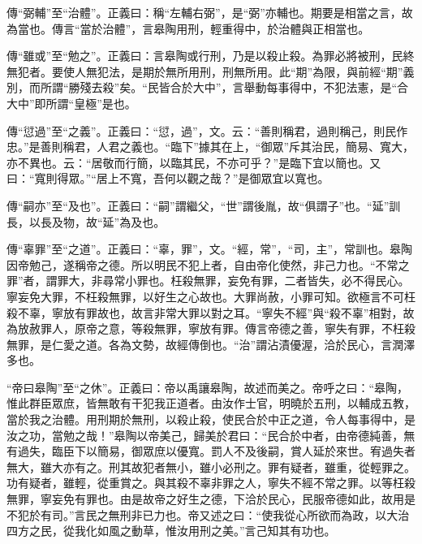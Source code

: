 {\noindent\zhuan{}\fzbyks 傳“弼輔”至“治體”。正義曰：稱“左輔右弼”，是“弼”亦輔也。期要是相當之言，故為當也。傳言“當於治體”，言皋陶用刑，輕重得中，於治體與正相當也。 \par}

{\noindent\zhuan{}\fzbyks 傳“雖或”至“勉之”。正義曰：言皋陶或行刑，乃是以殺止殺。為罪必將被刑，民終無犯者。要使人無犯法，是期於無所用刑，刑無所用。此“期”為限，與前經“期”義別，而所謂“勝殘去殺”矣。“民皆合於大中”，言舉動每事得中，不犯法憲，是“合大中”即所謂“皇極”是也。 \par}

{\noindent\zhuan{}\fzbyks 傳“愆過”至“之義”。正義曰：“愆，過”，文。云：“善則稱君，過則稱己，則民作忠。”是善則稱君，人君之義也。“臨下”據其在上，“御眾”斥其治民，簡易、寬大，亦不異也。云：“居敬而行簡，以臨其民，不亦可乎？”是臨下宜以簡也。又曰：“寬則得眾。”“居上不寬，吾何以觀之哉？”是御眾宜以寬也。 \par}

{\noindent\zhuan{}\fzbyks 傳“嗣亦”至“及也”。正義曰：“嗣”謂繼父，“世”謂後胤，故“俱謂子”也。“延”訓長，以長及物，故“延”為及也。 \par}

{\noindent\zhuan{}\fzbyks 傳“辜罪”至“之道”。正義曰：“辜，罪”，文。“經，常”，“司，主”，常訓也。皋陶因帝勉己，遂稱帝之德。所以明民不犯上者，自由帝化使然，非己力也。“不常之罪”者，謂罪大，非尋常小罪也。枉殺無罪，妄免有罪，二者皆失，必不得民心。寧妄免大罪，不枉殺無罪，以好生之心故也。大罪尚赦，小罪可知。欲極言不可枉殺不辜，寧放有罪故也，故言非常大罪以對之耳。“寧失不經”與“殺不辜”相對，故為放赦罪人，原帝之意，等殺無罪，寧放有罪。傳言帝德之善，寧失有罪，不枉殺無罪，是仁愛之道。各為文勢，故經傳倒也。“治”謂沾漬優渥，洽於民心，言潤澤多也。 \par}

{\noindent\shu{}\fzkt “帝曰皋陶”至“之休”。正義曰：帝以禹讓皋陶，故述而美之。帝呼之曰：“皋陶，惟此群臣眾庶，皆無敢有干犯我正道者。由汝作士官，明曉於五刑，以輔成五教，當於我之治體。用刑期於無刑，以殺止殺，使民合於中正之道，令人每事得中，是汝之功，當勉之哉！”皋陶以帝美己，歸美於君曰：“民合於中者，由帝德純善，無有過失，臨臣下以簡易，御眾庶以優寬。罰人不及後嗣，賞人延於來世。宥過失者無大，雖大亦有之。刑其故犯者無小，雖小必刑之。罪有疑者，雖重，從輕罪之。功有疑者，雖輕，從重賞之。與其殺不辜非罪之人，寧失不經不常之罪。以等枉殺無罪，寧妄免有罪也。由是故帝之好生之德，下洽於民心，民服帝德如此，故用是不犯於有司。”言民之無刑非已力也。帝又述之曰：“使我從心所欲而為政，以大治四方之民，從我化如風之動草，惟汝用刑之美。”言己知其有功也。 \par}

